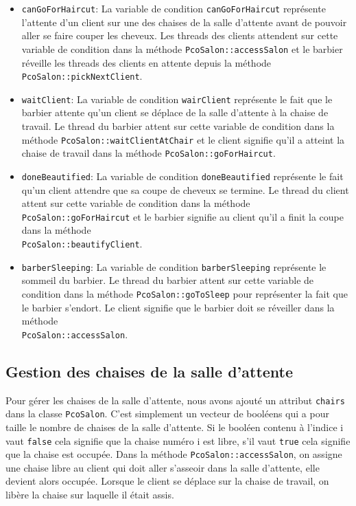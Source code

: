 \documentclass{article}
\begin{document}
\begin{itemize}
    \item \texttt{canGoForHaircut}: La variable de condition \texttt{canGoForHaircut} représente l'attente d'un client sur une des chaises 
    de la salle d'attente avant de pouvoir aller se faire couper les cheveux. Les threads des clients attendent sur cette variable de 
    condition dans la méthode \texttt{PcoSalon::accessSalon} et le barbier réveille les threads des clients en attente depuis la méthode 
    \texttt{PcoSalon::pickNextClient}.
    \item \texttt{waitClient}: La variable de condition \texttt{wairClient} représente le fait que le barbier attente qu'un client se déplace
    de la salle d'attente à la chaise de travail. Le thread du barbier attent sur cette variable de condition dans la méthode \texttt{PcoSalon::waitClientAtChair} et le 
    client signifie qu'il a atteint la chaise de travail dans la méthode \texttt{PcoSalon::goForHaircut}.
    \item \texttt{doneBeautified}: La variable de condition \texttt{doneBeautified} représente le fait qu'un client attendre que sa coupe de
    cheveux se termine. Le thread du client attent sur cette variable de condition dans la méthode \texttt{PcoSalon::goForHaircut} et le 
    barbier signifie au client qu'il a finit la coupe dans la méthode \\ \texttt{PcoSalon::beautifyClient}. 
    \item \texttt{barberSleeping}: La variable de condition \texttt{barberSleeping} représente le sommeil du barbier. Le thread du barbier attent sur cette variable 
    de condition dans la méthode \texttt{PcoSalon::goToSleep} pour représenter la fait que le barbier s'endort. Le 
    client signifie que le barbier doit se réveiller dans la méthode \\ \texttt{PcoSalon::accessSalon}.
\end{itemize}

\subsection*{Gestion des chaises de la salle d'attente}
Pour gérer les chaises de la salle d'attente, nous avons ajouté un attribut \texttt{chairs} dans la classe \texttt{PcoSalon}. C'est
simplement un vecteur de booléens qui a pour taille le nombre de chaises de la salle d'attente. Si le booléen contenu à l'indice i
vaut \texttt{false} cela signifie que la chaise numéro i est libre, s'il vaut \texttt{true} cela signifie que la chaise est occupée.
Dans la méthode \texttt{PcoSalon::accessSalon}, on assigne une chaise libre au client qui doit aller s'asseoir dans la salle d'attente,
elle devient alors occupée. Lorsque le client se déplace sur la chaise de travail, on libère la chaise sur laquelle il était assis.   
\end{document}
